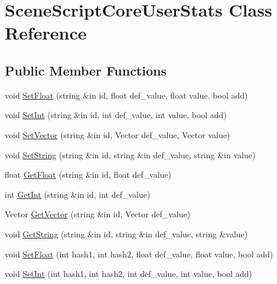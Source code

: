 \hypertarget{class_scene_script_core_user_stats}{}\section{Scene\+Script\+Core\+User\+Stats Class Reference}
\label{class_scene_script_core_user_stats}
\subsection*{Public Member Functions}
\begin{DoxyCompactItemize}
\item 
void \hyperlink{class_scene_script_core_user_stats_a8ec85269a59c811ebc8109a6d91cb347}{Set\+Float} (string \&in id, float def\+\_\+value, float value, bool add)
\item 
void \hyperlink{class_scene_script_core_user_stats_adeb607731443bdb88c8fafc311226587}{Set\+Int} (string \&in id, int def\+\_\+value, int value, bool add)
\item 
void \hyperlink{class_scene_script_core_user_stats_ab662b4b4c88e18bcec684bb19f2a00b0}{Set\+Vector} (string \&in id, Vector def\+\_\+value, Vector value)
\item 
void \hyperlink{class_scene_script_core_user_stats_a897e16d2aa8d959d6c2e5c78c628a3c1}{Set\+String} (string \&in id, string \&in def\+\_\+value, string \&in value)
\item 
float \hyperlink{class_scene_script_core_user_stats_a29d0ac5914ccd6fe9ff777f24439b61a}{Get\+Float} (string \&in id, float def\+\_\+value)
\item 
int \hyperlink{class_scene_script_core_user_stats_aec5e5d92f72e04f82403d67e2c56d0d9}{Get\+Int} (string \&in id, int def\+\_\+value)
\item 
Vector \hyperlink{class_scene_script_core_user_stats_ad6b1eb13d5a27b1cc9e4cc7b50f83aca}{Get\+Vector} (string \&in id, Vector def\+\_\+value)
\item 
void \hyperlink{class_scene_script_core_user_stats_aac27f1605a4967aba3036cfc67273146}{Get\+String} (string \&in id, string \&in def\+\_\+value, string \&value)
\item 
void \hyperlink{class_scene_script_core_user_stats_a87bd324cede646bc24650d3cf7324691}{Set\+Float} (int hash1, int hash2, float def\+\_\+value, float value, bool add)
\item 
void \hyperlink{class_scene_script_core_user_stats_adae99b6ee6ff220effdd6013ccc49adc}{Set\+Int} (int hash1, int hash2, int def\+\_\+value, int value, bool add)

\end{DoxyCompactItemize}
